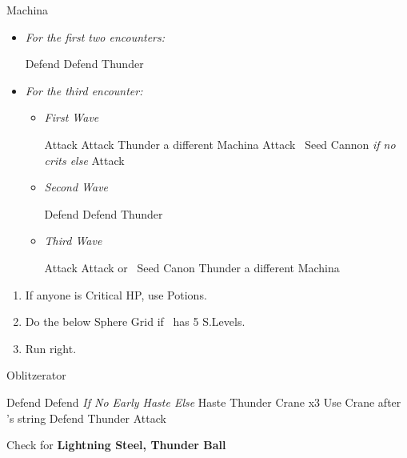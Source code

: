 \begin{battle}{Machina}
	\begin{itemize}
		\item \textit{For the first two encounters:}
		      \begin{itemize}
			      \tidusf Defend
			      \kimahrif Defend
			      \luluf Thunder
		      \end{itemize}
		\item \textit{For the third encounter:}
		      \begin{itemize}
			      \item \textit{First Wave}
			            \begin{itemize}
				            \tidusf Attack
				            \kimahrif Attack
				            \luluf Thunder a different Machina
				            \tidusf Attack
				            \kimahrif \od\ Seed Cannon \textit{if no crits else} Attack
			            \end{itemize}
			      \item \textit{Second Wave}
			            \begin{itemize}
				            \tidusf Defend
				            \kimahrif Defend
				            \luluf Thunder
			            \end{itemize}
			      \item \textit{Third Wave}
			            \begin{itemize}
				            \tidusf Attack
				            \kimahrif Attack or \od\ Seed Canon
				            \luluf Thunder a different Machina
			            \end{itemize}
		      \end{itemize}
	\end{itemize}
\end{battle}
\begin{enumerate}[resume]
	\item If anyone is Critical HP, use Potions.
	\item Do the below Sphere Grid if \tidus\ has 5 S.Levels.
	\item Run right. 
\end{enumerate}
\begin{battle}[3000]{Oblitzerator}
	\begin{itemize}
		\kimahrif Defend
		\tidusf Defend \textit{If No Early Haste Else} Haste \lulu
		\luluf Thunder Crane x3
		\tidusf Use Crane after \lulu's string
		\kimahrif Defend
		\luluf Thunder
		\tidusf Attack
	\end{itemize}
	Check for \textbf{Lightning Steel, Thunder Ball}
\end{battle}
